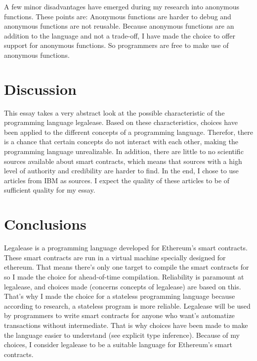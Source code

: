 \documentclass{uva-inf-article}
\begin{document}
\par A few minor disadvantages have emerged during my research into anonymous functions. 
These points are:
Anonymous functions are harder to debug and anonymous functions are not reusable. 
Because anonymous functions are an addition to the language and not a trade-off, 
I have made the choice to offer support for anonymous functions. 
So programmers are free to make use of anonymous functions.

\newpage

\section{Discussion}
\par This essay takes a very abstract look at the possible characteristic of the programming language legalease.
Based on these characteristics, choices have been applied to the different concepts of a programming language.
Therefor, there is a chance that certain concepts do not interact with each other, making the programming language unrealizable.
In addition, there are little to no scientific sources available about smart contracts, 
which means that sources with a high level of authority and credibility are harder to find. 
In the end, I chose to use articles from IBM as sources. 
I expect the quality of these articles to be of sufficient quality for my essay.

\section{Conclusions}
\par Legalease is a programming language developed for Ethereum's smart contracts. 
These smart contracts are run in a virtual machine specially designed for ethereum.
That means there's only one target to compile the smart contracts for so I made the choice for ahead-of-time compilation.
Reliability is paramount at legalease, and choices made (concerns concepts of legalease) are based on this.
That's why I made the choice for a stateless programming language because according to research, a stateless program is more reliable.
Legalease will be used by programmers to write smart contracts for anyone who want's automatize transactions without intermediate.
That is why choices have been made to make the language easier to understand (see explicit type inference).
Because of my choices, I consider legalease to be a suitable language for Ethereum's smart contracts.
\end{document}
